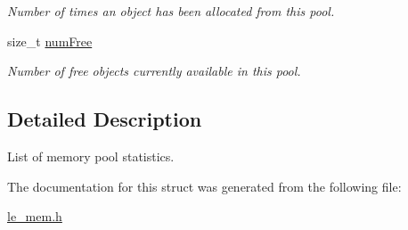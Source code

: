 \begin{DoxyCompactItemize}
\begin{DoxyCompactList}\small\item\em Number of times an object has been allocated from this pool. \end{DoxyCompactList}\item 
size\+\_\+t \hyperlink{structle__mem___pool_stats__t_adbc69b9f0b2b6719fdb9f40e29688381}{num\+Free}\hypertarget{structle__mem___pool_stats__t_adbc69b9f0b2b6719fdb9f40e29688381}{}\label{structle__mem___pool_stats__t_adbc69b9f0b2b6719fdb9f40e29688381}

\begin{DoxyCompactList}\small\item\em Number of free objects currently available in this pool. \end{DoxyCompactList}\end{DoxyCompactItemize}


\subsection{Detailed Description}
List of memory pool statistics. 

The documentation for this struct was generated from the following file\+:\begin{DoxyCompactItemize}
\item 
\hyperlink{le__mem_8h}{le\+\_\+mem.\+h}\end{DoxyCompactItemize}
